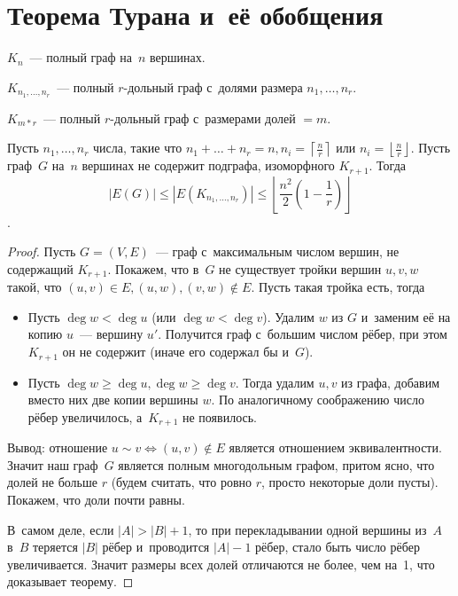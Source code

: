 \documentclass{article}
\begin{document}
\section{Теорема Турана и~её обобщения}

$K_n$~--- полный граф на~$n$ вершинах.

$K_{n_1, \ldots, n_r}$~--- полный $r$-дольный граф с~долями размера $n_1,
\ldots, n_r$.

$K_{m \ast r}$~--- полный $r$-дольный граф с~размерами долей $=m$.

\begin{theorem}[Туран, 1941]
	Пусть $n_1, \ldots, n_r$ числа, такие что $n_1 + \ldots + n_r = n, n_i =
	\left\lceil \frac{n}{r} \right\rceil$ или $n_i = \left\lfloor \frac{n}{r}
	\right\rfloor$. Пусть граф~$G$ на~$n$ вершинах не содержит подграфа,
	изоморфного $K_{r+1}$. Тогда
	$$ |E(G)| \le |E(K_{n_1,\ldots,n_r})| \le \left\lfloor \frac{n^2}{2} \left(1 -
	\frac{1}{r}\right) \right\rfloor $$.
\end{theorem}
\begin{proof}
	Пусть $G = (V, E)$~--- граф с~максимальным числом вершин, не содержащий
	$K_{r+1}$. Покажем, что в~$G$ не существует тройки вершин $u, v, w$ такой, что
	$(u, v) \in E, (u, w), (v, w) \notin E$. Пусть такая тройка есть, тогда
	\begin{itemize}
		\item Пусть $\deg w < \deg u$ (или $\deg w < \deg v$). Удалим $w$ из $G$
			и~заменим её на копию $u$~--- вершину $u'$. Получится граф с~большим
			числом рёбер, при этом $K_{r+1}$ он не содержит (иначе его содержал бы
			и~$G$).
		\item Пусть $\deg w \ge \deg u, \deg w \ge \deg v$. Тогда удалим $u, v$ из
			графа, добавим вместо них две копии вершины $w$. По аналогичному
			соображению число рёбер увеличилось, а~$K_{r+1}$ не появилось.
	\end{itemize}

	Вывод: отношение $u \sim v \Leftrightarrow (u, v) \notin E$ является
	отношением эквивалентности. Значит наш граф~$G$ является полным многодольным
	графом, притом ясно, что долей не больше $r$ (будем считать, что ровно $r$,
	просто некоторые доли пусты). Покажем, что доли почти равны.

	В~самом деле, если $\left|A\right| > |B| + 1$, то при перекладывании одной
	вершины из~$A$ в~$B$ теряется $|B|$ рёбер и~проводится $\left|A\right| - 1$
	рёбер, стало быть число рёбер увеличивается. Значит размеры всех долей
	отличаются не более, чем на~1, что доказывает теорему.
\end{proof}
\end{document}

